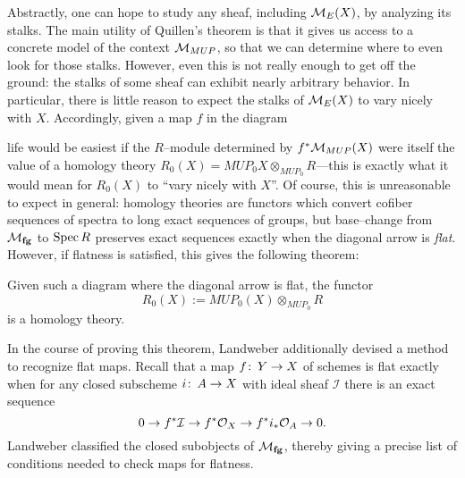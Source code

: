 Abstractly, one can hope to study any sheaf, including $\mathcal{M}_{E}(X)$, by analyzing its stalks.  The main utility of Quillen's theorem is that it gives us access to a concrete model of the context $\mathcal{M}_{MUP}$, so that we can determine where to even look for those stalks.  However, even this is not really enough to get off the ground: the stalks of some sheaf can exhibit nearly arbitrary behavior.  In particular, there is little reason to expect the stalks of $\mathcal{M}_{E}(X)$ to vary nicely with $X$.  Accordingly, given a map $f$ in the diagram
\begin{center}
\end{center}
life would be easiest if the $R$--module determined by $f^* \mathcal{M}_{MUP}(X)$ were itself the value of a homology theory $R_0(X) = MUP_0 X \otimes_{MUP_0} R$---this is exactly what it would mean for $R_0(X)$ to ``vary nicely with $X$''.  Of course, this is unreasonable to expect in general: homology theories are functors which convert cofiber sequences of spectra to long exact sequences of groups, but base--change from $\mathcal{M}_{\mathbf{fg}}$ to $\operatorname{Spec} R$ preserves exact sequences exactly when the diagonal arrow is \textit{flat}.  However, if flatness is satisfied, this gives the following theorem:

\begin{theorem}[Landweber]\label{LandwebersStackyTheorem}
Given such a diagram where the diagonal arrow is flat, the functor \[R_0(X) := MUP_0(X) \otimes_{MUP_0} R\] is a homology theory.
\end{theorem}

\noindent In the course of proving this theorem, Landweber additionally devised a method to recognize flat maps.  Recall that a map $f\colon\thinspace Y \to X$ of schemes is flat exactly when for any closed subscheme $i\colon\thinspace A \to X$ with ideal sheaf $\mathcal I$ there is an exact sequence \[0 \to f^* \mathcal{I} \to f^* \mathcal{O}_X \to f^* i_* \mathcal{O}_A \to 0.\]  Landweber classified the closed subobjects of $\mathcal{M}_{\mathbf{fg}}$, thereby giving a precise list of conditions needed to check maps for flatness.

